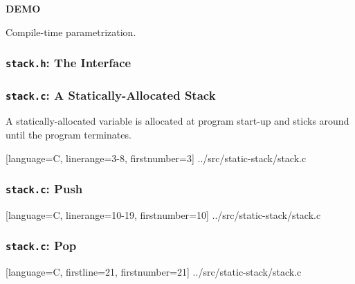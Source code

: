 \begin{frame}

\begin{center}

\Huge \textbf{DEMO}

\bigskip

\large Compile-time parametrization.

\end{center}

\end{frame}


\begin{frame}[fragile]

\frametitle{\texttt{stack.h}: The Interface}



\end{frame}


\begin{frame}[fragile]

\frametitle{\texttt{stack.c}: A Statically-Allocated Stack}

\begin{center}

A statically-allocated variable is allocated at program start-up
and sticks around until the program terminates.

\end{center}

\pause

\vspace{\fill}

%
  [language=C, linerange={3-8}, firstnumber=3]%
  {../src/static-stack/stack.c}

\end{frame}


\begin{frame}[fragile]

\frametitle{\texttt{stack.c}: Push}

%
  [language=C, linerange={10-19}, firstnumber=10]%
  {../src/static-stack/stack.c}

\end{frame}


\begin{frame}[fragile]

\frametitle{\texttt{stack.c}: Pop}

%
  [language=C, firstline=21, firstnumber=21]%
  {../src/static-stack/stack.c}

\end{frame}


